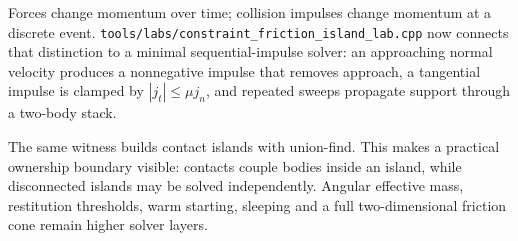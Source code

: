 \hypertarget{appendix-c39931e6e4c2-constraint-level-continuation}{}

Forces change momentum over time; collision impulses change momentum at a discrete event. \texttt{tools/labs/constraint\_friction\_island\_lab.cpp} now connects that distinction to a minimal sequential-impulse solver: an approaching normal velocity produces a nonnegative impulse that removes approach, a tangential impulse is clamped by \(|j_t|\le\mu j_n\), and repeated sweeps propagate support through a two-body stack.

The same witness builds contact islands with union-find. This makes a practical ownership boundary visible: contacts couple bodies inside an island, while disconnected islands may be solved independently. Angular effective mass, restitution thresholds, warm starting, sleeping and a full two-dimensional friction cone remain higher solver layers.
